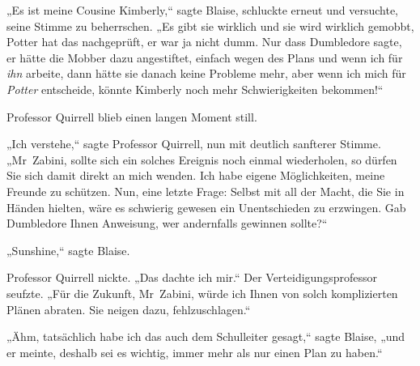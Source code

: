 „Es ist meine Cousine Kimberly,“ sagte Blaise, schluckte erneut und versuchte, seine Stimme zu beherrschen. „Es gibt sie wirklich und sie wird wirklich gemobbt, Potter hat das nachgeprüft, er war ja nicht dumm. Nur dass Dumbledore sagte, er hätte die Mobber dazu angestiftet, einfach wegen des Plans und wenn ich für \emph{ihn} arbeite, dann hätte sie danach keine Probleme mehr, aber wenn ich mich für \emph{Potter} entscheide, könnte Kimberly noch mehr Schwierigkeiten bekommen!“

Professor Quirrell blieb einen langen Moment still.

„Ich verstehe,“ sagte Professor Quirrell, nun mit deutlich sanfterer Stimme. „Mr~Zabini, sollte sich ein solches Ereignis noch einmal wiederholen, so dürfen Sie sich damit direkt an mich wenden. Ich habe eigene Möglichkeiten, meine Freunde zu schützen. Nun, eine letzte Frage: Selbst mit all der Macht, die Sie in Händen hielten, wäre es schwierig gewesen ein Unentschieden zu erzwingen. Gab Dumbledore Ihnen Anweisung, wer andernfalls gewinnen sollte?“

„Sunshine,“ sagte Blaise.

Professor Quirrell nickte. „Das dachte ich mir.“ Der Verteidigungsprofessor seufzte. „Für die Zukunft, Mr~Zabini, würde ich Ihnen von solch komplizierten Plänen abraten. Sie neigen dazu, fehlzuschlagen.“

„Ähm, tatsächlich habe ich das auch dem Schulleiter gesagt,“ sagte Blaise, „und er meinte, deshalb sei es wichtig, immer mehr als nur einen Plan zu haben.“


